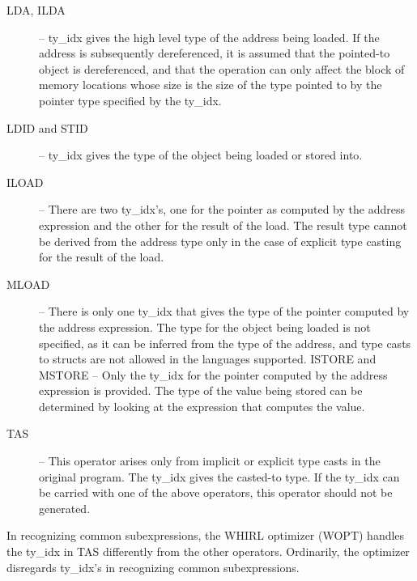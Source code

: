 \documentclass{article}
\begin{document}
\begin{description}
\item[LDA, ILDA] -- ty\_idx gives the high level type of the address
being loaded. If the address is subsequently dereferenced, it is
assumed that the pointed-to object is dereferenced, and that the
operation can only affect the block of memory locations whose size
is the size of the type pointed to by the pointer type specified
by the ty\_idx. 

\item[LDID and STID] -- ty\_idx gives the type of the object
being loaded or stored into.

\item[ILOAD] -- There are two ty\_idx's, one for the pointer as computed
by the address expression and the other for the result of the load.
The result type cannot be derived from the address type only in
the case of explicit type casting for the result of the load.

\item[MLOAD] -- There is only one ty\_idx that gives the type of the
pointer computed by the address expression. The type for the object
being loaded is not specified, as it can be inferred from the type
of the address, and type casts to structs are not allowed in the
languages supported. ISTORE and MSTORE -- Only the ty\_idx for the
pointer computed by the address expression is provided. The type of
the value being stored can be determined by looking at the expression
that computes the value.

\item[TAS] -- This operator arises only from implicit or explicit type
casts in the original program. The ty\_idx gives the casted-to type.
If the ty\_idx can be carried with one of the above operators, this
operator should not be generated.
\end{description}

In recognizing common subexpressions, the WHIRL optimizer (WOPT) handles
the ty\_idx in
TAS differently from the other operators. Ordinarily, the optimizer
disregards ty\_idx's in recognizing common subexpressions.
\end{document}
